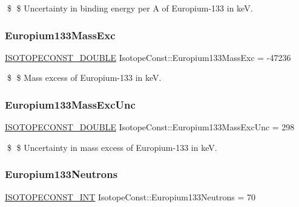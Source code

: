 \$ \$ Uncertainty in binding energy per A of Europium-\/133 in keV. \mbox{\label{group___isotope_const-_europium-_eu133_ga41d5d90df2d22d5d19a2fc58bdb2bec1}} 
\subsubsection{\texorpdfstring{Europium133\+Mass\+Exc}{Europium133MassExc}}
{\footnotesize\ttfamily \mbox{\hyperlink{group___isotope_const-_macros_ga8f45a7272ce02c0b4c65c44636ed719a}{I\+S\+O\+T\+O\+P\+E\+C\+O\+N\+S\+T\+\_\+\+D\+O\+U\+B\+LE}} Isotope\+Const\+::\+Europium133\+Mass\+Exc = -\/47236}

\$ \$ Mass excess of Europium-\/133 in keV. \mbox{\label{group___isotope_const-_europium-_eu133_gae4752cee429a502f4dd7c9d5dee4f3c3}} 
\subsubsection{\texorpdfstring{Europium133\+Mass\+Exc\+Unc}{Europium133MassExcUnc}}
{\footnotesize\ttfamily \mbox{\hyperlink{group___isotope_const-_macros_ga8f45a7272ce02c0b4c65c44636ed719a}{I\+S\+O\+T\+O\+P\+E\+C\+O\+N\+S\+T\+\_\+\+D\+O\+U\+B\+LE}} Isotope\+Const\+::\+Europium133\+Mass\+Exc\+Unc = 298}

\$ \$ Uncertainty in mass excess of Europium-\/133 in keV. \mbox{\label{group___isotope_const-_europium-_eu133_gaf19fdf2b492f673355fb79f5a6e98c13}} 
\subsubsection{\texorpdfstring{Europium133\+Neutrons}{Europium133Neutrons}}
{\footnotesize\ttfamily \mbox{\hyperlink{group___isotope_const-_macros_ga5f18360b3e99483a35c32d789e62621c}{I\+S\+O\+T\+O\+P\+E\+C\+O\+N\+S\+T\+\_\+\+I\+NT}} Isotope\+Const\+::\+Europium133\+Neutrons = 70}


